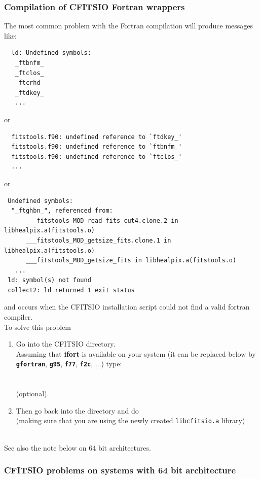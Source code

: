 \documentclass[12pt,twoside]{article}
\begin{document}
\subsubsection*{Compilation of CFITSIO Fortran wrappers}
The most common problem with the Fortran \healpix compilation will produce
messages like:
\begin{verbatim}
  ld: Undefined symbols:
   _ftbnfm_
   _ftclos_
   _ftcrhd_
   _ftdkey_
   ...
\end{verbatim}
or
\begin{verbatim}
  fitstools.f90: undefined reference to `ftdkey_'
  fitstools.f90: undefined reference to `ftbnfm_'
  fitstools.f90: undefined reference to `ftclos_'
  ...
\end{verbatim}
or
\begin{verbatim}
 Undefined symbols:
  "_ftghbn_", referenced from:
      ___fitstools_MOD_read_fits_cut4.clone.2 in libhealpix.a(fitstools.o)
      ___fitstools_MOD_getsize_fits.clone.1 in libhealpix.a(fitstools.o)
      ___fitstools_MOD_getsize_fits in libhealpix.a(fitstools.o)
   ...
 ld: symbol(s) not found
 collect2: ld returned 1 exit status
\end{verbatim}
and occurs when the CFITSIO installation script could not find a valid fortran compiler.\\
To solve this problem
\begin{enumerate}
\item Go into the CFITSIO directory. \\
Assuming that {\bf ifort} is available on your
system (it can be replaced below by \texttt{\bf gfortran}, \texttt{\bf g95}, \texttt{\bf f77}, \texttt{\bf f2c}, $\ldots$) type: \\
 \\
 \\
 \hskip 0.3cm (optional).
%
\item Then go back into the \healpix directory and do \\
 \hskip 0.3cm (making sure that you are using the newly created \texttt{libcfitsio.a} library) \\
 \\
\end{enumerate}
See also the note below on 64 bit architectures.

\subsubsection*{CFITSIO problems on systems with 64 bit architecture}
\end{document}
